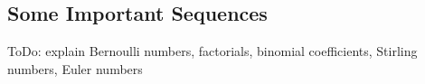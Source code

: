 











\subsection{Some Important Sequences} 
ToDo: explain Bernoulli numbers, factorials, binomial coefficients, Stirling numbers, Euler numbers











